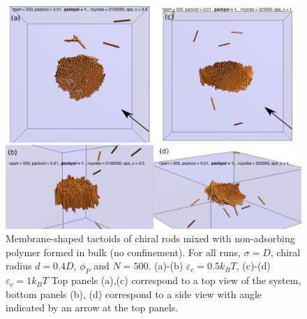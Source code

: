 \begin{figure}
	\includegraphics[width = .7\columnwidth]{figures/chapter-6/samples}
	\caption{Membrane-shaped tactoids of chiral rods mixed with non-adsorbing polymer formed in bulk (no confinement). For all runs, $\sigma = D$, chiral radius $d = 0.4D$, $\phi_{P}$ and $N = 500$. (a)-(b) $\varepsilon_{c}=0.5k_BT$, (c)-(d) $\varepsilon_{c}=1k_BT$ Top panels (a),(c) correspond to a top view of the system, bottom panels (b), (d) correspond to a side view with angle indicated by an arrow at the top panels.}
	\label{samples}
\end{figure}

